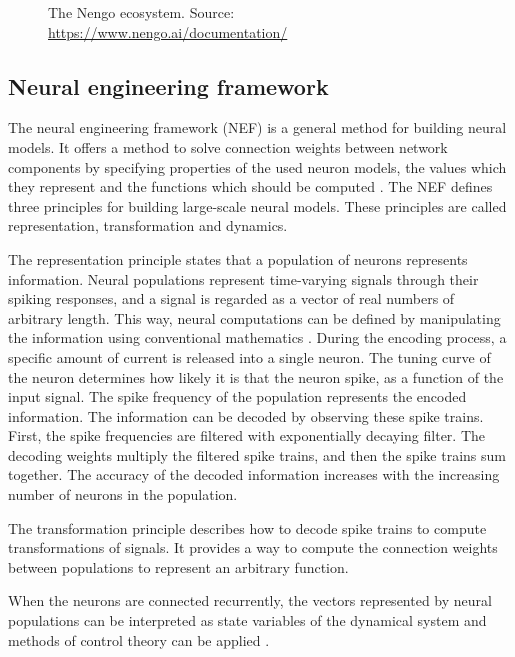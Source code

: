 \begin{figure}[ht]
    \centering
    
    \caption{The Nengo ecosystem. Source: \url{https://www.nengo.ai/documentation/}}
    \label{fig:nengo_ecosystem}
\end{figure}

\subsection{Neural engineering framework}
The neural engineering framework (NEF) is a general method for building neural models. It offers a method to solve connection weights between network components by specifying properties of the used neuron models, the values which they represent and the functions which should be computed \cite{stewartTechnicalOverviewNeural2012}. The NEF defines three principles for building large-scale neural models. These principles are called representation, transformation and dynamics. \par
The representation principle states that a population of neurons represents information. Neural populations represent time-varying signals through their spiking responses, and a signal is regarded as a vector of real numbers of arbitrary length.  This way, neural computations can be defined by manipulating the information using conventional mathematics \cite{bekolayNengoPythonTool2014}. During the encoding process, a specific amount of current is released into a single neuron. The tuning curve of the neuron determines how likely it is that the neuron spike, as a function of the input signal. The spike frequency of the population represents the encoded information. The information can be decoded by observing these spike trains. First, the spike frequencies are filtered with exponentially decaying filter. The decoding weights multiply the filtered spike trains, and then the spike trains sum together. The accuracy of the decoded information increases with the increasing number of neurons in the population. \par
The transformation principle describes how to decode spike trains to compute transformations of signals. It provides a way to compute the connection weights between populations to represent an arbitrary function. \par
When the neurons are connected recurrently, the vectors represented by neural populations can be interpreted as state variables of the dynamical system and methods of control theory can be applied \cite{bekolayNengoPythonTool2014}.


